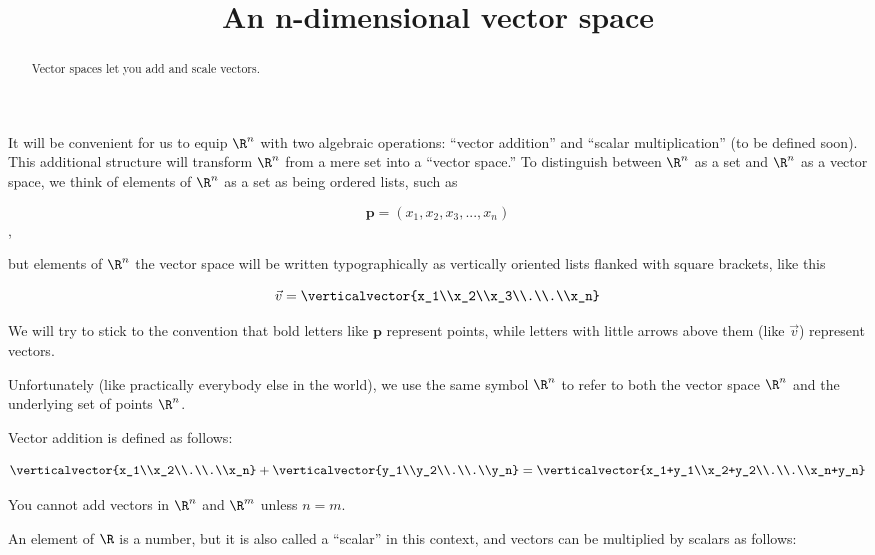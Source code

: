 \documentclass{ximera}
\title{An n-dimensional vector space}
\begin{document}
\begin{abstract}
	Vector spaces let you add and scale vectors.
\end{abstract}

It will be convenient for us to equip $\R^n$ with two algebraic
operations: ``vector addition'' and ``scalar multiplication'' (to be
defined soon).  This additional structure will transform $\R^n$ from a
mere set into a ``vector space.''  To distinguish between $\R^n$ as a
set and $\R^n$ as a vector space, we think of elements of $\R^n$ as a
set as being ordered lists, such as
 
 \[\mathbf{p} = (x_1,x_2,x_3, ...,x_n)\],
 
but elements of $\R^n$ the vector space will be written typographically as vertically oriented lists flanked with square brackets, like this 
 
  \[ \vec{v}= \verticalvector{x_1\\x_2\\x_3\\.\\.\\x_n}\]
 
We will try to stick to the convention that bold letters like $\mathbf{p}$ represent points, while letters with little arrows above them (like $\vec{v}$) represent vectors. 

Unfortunately (like practically everybody else in the world), we use
the same symbol $\R^n$ to refer to both the vector space $\R^n$ and
the underlying set of points $\R^n$.
 
Vector addition is defined as follows:
 
\[\verticalvector{x_1\\x_2\\.\\.\\x_n} +\verticalvector{y_1\\y_2\\.\\.\\y_n}=\verticalvector{x_1+y_1\\x_2+y_2\\.\\.\\x_n+y_n}\]

\begin{warning}
  You cannot add vectors in $\R^n$ and $\R^m$ unless $n = m$.
\end{warning}

An element of $\R$ is a number, but it is also called a ``scalar'' in this context, and vectors can be multiplied by scalars as follows:
	
\end{document}
